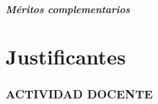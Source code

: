 \subsubsection{Méritos complementarios}
\label{sec:meritosdocenciac}
% 



\newpage

\part{Justificantes}


%

\newpage

\section{ACTIVIDAD DOCENTE}

%

\newpage

%

\newpage

%
\newpage

%

